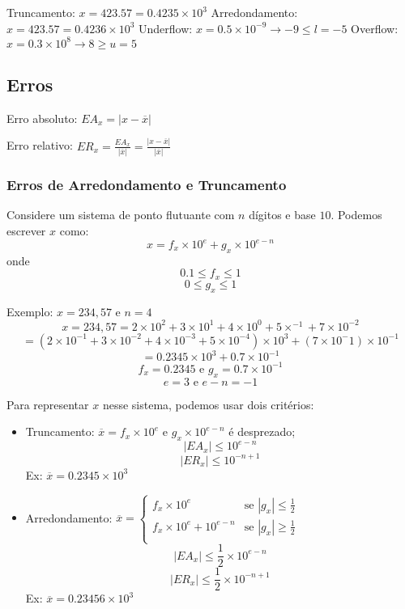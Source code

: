 \documentclass[a4paper,oneside,article,table]{article}
\begin{document}
        Truncamento: $x = 423.5\boxed{7} = 0.4235 \times 10^3$
        Arredondamento: $x = 423.5\boxed{7} = 0.4236 \times 10^3$
        Underflow: $x = 0.5 \times 10^{-9} \rightarrow -9 \le l = -5$
        Overflow: $x = 0.3 \times 10^8 \rightarrow 8 \ge u = 5$

        \subsection{Erros}

        \begin{description}

            \item Erro absoluto: ${EA}_x = |x - \overline{x}|$
            \item Erro relativo: ${ER}_x = \frac{{EA}_x}{|\overline{x}|} = \frac{|x - \overline{x}|}{|\overline{x}|}$

        \end{description}

        \subsubsection{Erros de Arredondamento e Truncamento}
        Considere um sistema de ponto flutuante com $n$ dígitos e base $10$. Podemos escrever $x$ como:
        \[x = f_x \times 10^e + g_x \times 10^{e-n}\]
        onde
        \[0.1 \leq f_x \le 1\]
        \[0 \leq g_x \le 1\]

        Exemplo: $x=234,57$ e $n=4$
        \[x = 234,57 = 2 \times 10^2 + 3 \times 10^1 + 4 \times 10^0 + 5 \times^{-1} + 7 \times 10^{-2}\]
        \[= (2 \times 10^{-1} + 3 \times 10^{-2} + 4 \times 10^{-3} + 5 \times 10^{-4}) \times 10^3 + (7 \times 10^-1) \times 10^{-1}\]
        \[= 0.2345 \times 10^{3} + 0.7 \times 10^{-1}\]
        \[f_x = 0.2345 \textrm{ e } g_x =0.7 \times 10^{-1}\]
        \[e = 3 \textrm{ e } e-n = -1\]

        Para representar $x$ nesse sistema, podemos usar dois critérios:
        \begin{itemize}
            \item Truncamento: $\overline{x} = f_x \times 10^e$ e $g_x \times 10^{e-n}$ é desprezado;\\
                \[|EA_x| \le 10^{e-n}\]
                \[|ER_x| \le 10^{-n+1}\]
                Ex: $\overline{x} = 0.2345 \times 10^3$
            \item Arredondamento: $\overline{x} = \begin{cases}
                    f_x  \times 10^e & \text{se $|g_x| \le \frac{1}{2}$}\\
                    f_x  \times 10^e  + 10^{e - n} & \text{se $|g_x| \geq \frac{1}{2}$}\\
                \end{cases}$\\
                \[|EA_x| \le \frac{1}{2} \times 10^{e-n}\]
                \[|ER_x| \le \frac{1}{2} \times 10^{-n+1}\]
                Ex: $\overline{x} = 0.23456 \times 10^3$
        \end{itemize}
\end{document}
